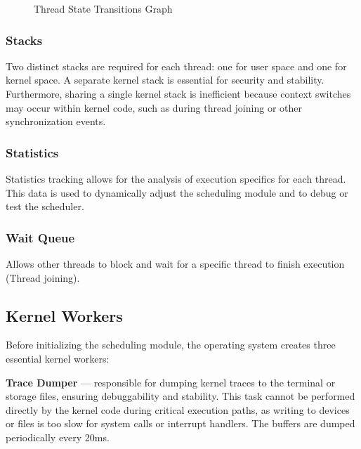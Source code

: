 \documentclass[a4paper,10pt,twoside]{report}
\theoremstyle{definition}
\begin{document}
\begin{figure}[p]
    \centering
    
    \caption{Thread State Transitions Graph}
    \label{fig:thread-states}
\end{figure}

\restoregeometry

\subsubsection{Stacks}

Two distinct stacks are required for each thread: one for user space and one for kernel space. A separate kernel stack is essential for security and stability. Furthermore, sharing a single kernel stack is inefficient because context switches may occur within kernel code, such as during thread joining or other synchronization events.

\subsubsection{Statistics}

Statistics tracking allows for the analysis of execution specifics for each thread. This data is used to dynamically adjust the scheduling module and to debug or test the scheduler.

\subsubsection{Wait Queue}

Allows other threads to block and wait for a specific thread to finish execution (Thread joining).

\subsection{Kernel Workers}
\label{subsubsec:kworkers}

Before initializing the scheduling module, the operating system creates three essential kernel workers:

\textbf{Trace Dumper} --- responsible for dumping kernel traces to the terminal or storage files, ensuring debuggability and stability. This task cannot be performed directly by the kernel code during critical execution paths, as writing to devices or files is too slow for system calls or interrupt handlers. The buffers are dumped periodically every 20ms.
\end{document}
